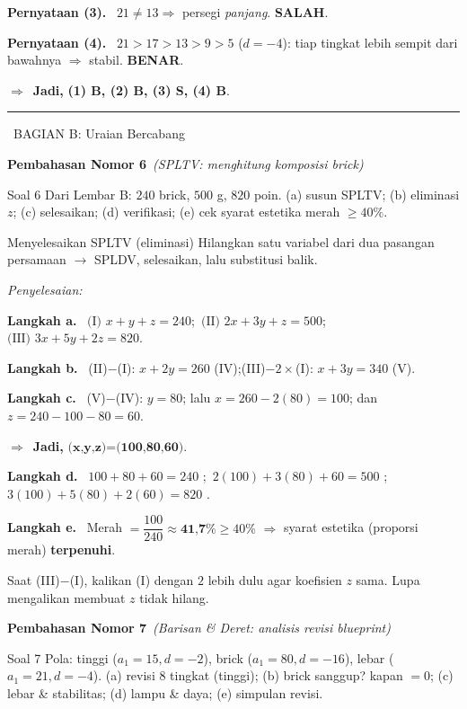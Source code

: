 \documentclass[11pt,a4paper]{article}
\newcommand{\jawab}{\par\smallskip\noindent\textit{\textcolor{oranye}{Penyelesaian:}}\par\smallskip}
\newcommand{\langkah}[1]{\par\smallskip\noindent\textbf{\textcolor{biru}{Langkah #1.}}\ }
\newcommand{\jadi}{\par\smallskip\noindent$\Rightarrow$\ \textbf{Jadi, }}
\newcommand{\benar}{\textbf{\textcolor{hijau}{BENAR}}}
\newcommand{\salah}{\textbf{\textcolor{merah}{SALAH}}}
\newcommand{\pernyataan}[1]{\par\smallskip\noindent\textbf{Pernyataan (#1).}\ }
\newcommand{\bagianjudul}[1]{\par\bigskip\noindent%
  {\large\bfseries\color{ungu}\rule[-2pt]{4pt}{16pt}\ #1}\par\smallskip}
\newcommand{\nomorjudul}[2]{\par\bigskip\noindent%
  {\large\bfseries\color{ungu}Pembahasan Nomor #1}\ {\normalfont\itshape\color{gray}(#2)}\par\nopagebreak\smallskip}
\begin{document}
\pernyataan{3} $21\neq13\Rightarrow$ persegi \emph{panjang}. \salah.

\pernyataan{4} $21>17>13>9>5$ ($d=-4$): tiap tingkat lebih sempit dari bawahnya
$\Rightarrow$ stabil. \benar.

\jadi \textbf{(1) B, (2) B, (3) S, (4) B}.

\bagianjudul{BAGIAN B: Uraian Bercabang}

\nomorjudul{6}{SPLTV: menghitung komposisi brick}
\begin{soalbox}{Soal 6}
Dari Lembar B: $240$ brick, $500$ g, $820$ poin. (a) susun SPLTV; (b) eliminasi
$z$; (c) selesaikan; (d) verifikasi; (e) cek syarat estetika merah $\ge40\%$.
\end{soalbox}

\begin{ingat}{Menyelesaikan SPLTV (eliminasi)}
Hilangkan satu variabel dari dua pasangan persamaan $\to$ SPLDV, selesaikan, lalu
substitusi balik.
\end{ingat}

\jawab
\langkah{a} $\text{(I) } x+y+z=240$;\ $\text{(II) } 2x+3y+z=500$;\
$\text{(III) } 3x+5y+2z=820$.

\langkah{b} (II)$-$(I): $x+2y=260$ (IV);\quad (III)$-2\times$(I): $x+3y=340$ (V).

\langkah{c} (V)$-$(IV): $y=80$; lalu $x=260-2(80)=100$; dan $z=240-100-80=60$.
\jadi $\textbf{(x,y,z)=(100,80,60)}$.

\langkah{d} $100+80+60=240$ \checkmark;\ $2(100)+3(80)+60=500$ \checkmark;\
$3(100)+5(80)+2(60)=820$ \checkmark.

\langkah{e} Merah $=\dfrac{100}{240}\approx\textbf{41{,}7\%}\ge40\%$
$\Rightarrow$ syarat estetika (proporsi merah) \textbf{terpenuhi}.

\begin{jebakan}
Saat (III)$-$(I), kalikan (I) dengan $2$ lebih dulu agar koefisien $z$ sama.
Lupa mengalikan membuat $z$ tidak hilang.
\end{jebakan}

\nomorjudul{7}{Barisan \& Deret: analisis revisi blueprint}
\begin{soalbox}{Soal 7}
Pola: tinggi ($a_1=15,d=-2$), brick ($a_1=80,d=-16$), lebar ($a_1=21,d=-4$).
(a) revisi $8$ tingkat (tinggi); (b) brick sanggup? kapan $=0$; (c) lebar \&
stabilitas; (d) lampu \& daya; (e) simpulan revisi.
\end{soalbox}
\end{document}
